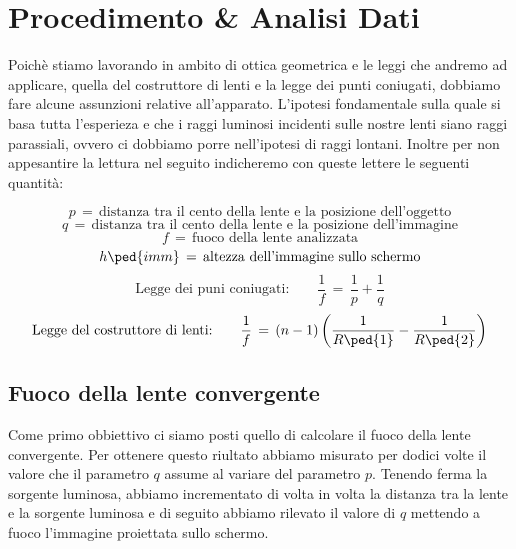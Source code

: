 \section{Procedimento \& Analisi Dati}

Poichè stiamo lavorando in ambito di ottica geometrica e le leggi che andremo ad applicare, quella del costruttore di lenti e la legge dei punti coniugati, dobbiamo fare alcune assunzioni relative all'apparato.
L'ipotesi fondamentale sulla quale si basa tutta l'esperieza e che i raggi luminosi incidenti sulle nostre lenti siano raggi parassiali, ovvero ci dobbiamo porre nell'ipotesi di raggi lontani.
Inoltre per non appesantire la lettura nel seguito indicheremo con queste lettere le seguenti quantità:


\begin{equation*}
	p \,=\, \text{distanza tra il cento della lente e la posizione dell'oggetto}
\end{equation*}
\begin{equation*}
	q \,=\, \text{distanza tra il cento della lente e la posizione dell'immagine}
\end{equation*}
\begin{equation*}
	f \,=\, \text{fuoco della lente analizzata}
\end{equation*}
\begin{equation*}
	h \ped{imm} \,=\, \text{altezza dell'immagine sullo schermo}
\end{equation*}
\begin{equation}
	\text{Legge dei puni coniugati:} \qquad \frac{1}{f} \,=\, \frac{1}{p} + \frac{1}{q}
	\label{coniugati}
\end{equation}
\begin{equation}
	\text{Legge del costruttore di lenti:} \qquad \frac{1}{f} \,=\, (n-1)\left(\frac{1}{R\ped{1}}-\frac{1}{R\ped{2}}\right)
	\label{costruttore}
\end{equation}


\subsection{Fuoco della lente convergente}

Come primo obbiettivo ci siamo posti quello di calcolare il fuoco della lente convergente. Per ottenere questo riultato abbiamo misurato per dodici volte il valore che il parametro $q$ assume al variare del parametro $p$. Tenendo ferma la sorgente luminosa, abbiamo incrementato di volta in volta la distanza tra la lente e la sorgente luminosa e di seguito abbiamo rilevato il valore di $q$ mettendo a fuoco l'immagine proiettata sullo schermo.

